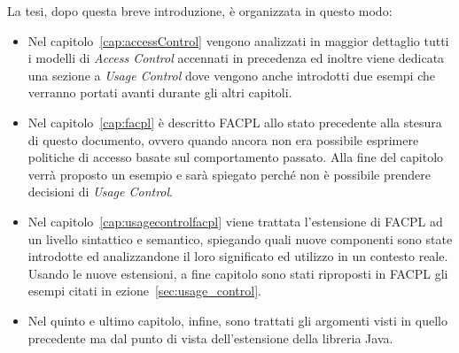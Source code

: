La tesi, dopo questa breve introduzione, è organizzata in questo modo: 
\begin{itemize}
\item Nel capitolo~\ref{cap:accessControl} vengono
analizzati in maggior dettaglio tutti i modelli di \textit{Access Control} accennati
in precedenza ed inoltre viene dedicata una sezione a \textit{Usage Control}
dove vengono anche introdotti due esempi che verranno portati avanti
durante gli altri capitoli.
\item Nel capitolo~\ref{cap:facpl} è descritto FACPL allo stato
precedente alla stesura di questo documento, ovvero quando ancora non
era possibile esprimere politiche di accesso basate sul comportamento
passato. Alla fine del capitolo verrà proposto un esempio e sarà
spiegato perché non è possibile prendere decisioni di \textit{Usage Control}.
\item Nel capitolo~\ref{cap:usagecontrolfacpl} viene trattata l’estensione di FACPL ad un livello sintattico
e semantico, spiegando quali nuove componenti sono state introdotte ed
analizzandone il loro significato ed utilizzo in un contesto reale.
Usando le nuove estensioni, a fine capitolo sono stati riproposti in FACPL gli esempi citati in
ezione~\ref{sec:usage_control}.
\item Nel quinto e ultimo capitolo, infine, sono trattati gli argomenti
visti in quello precedente ma dal punto di vista dell’estensione della
libreria Java.
\end{itemize}
